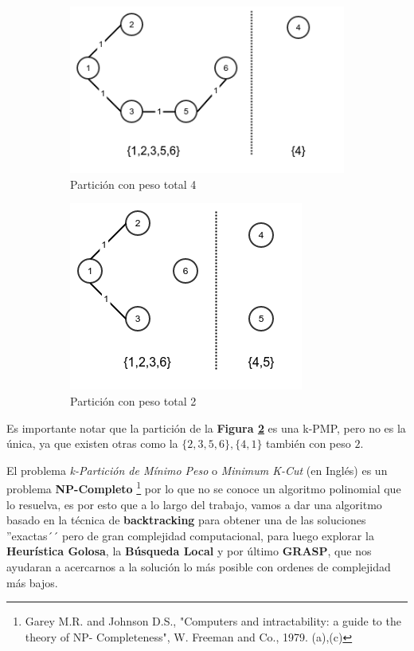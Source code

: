 \begin{figure}[H]
	\begin{subfigure}{.5\textwidth}
		\includegraphics[scale=0.5]{intro/ejemplito3.png}
		\caption{Partici\'on con peso total 4}
		\label{ejemplito3}
	\end{subfigure}
	\begin{subfigure}{.5\textwidth}
		\centering
		\includegraphics[scale=0.5]{intro/ejemplito4.png}
		\caption{Partici\'on con peso total 2}
		\label{ejemplito4}
	\end{subfigure}
\caption{}
\label{}
\end{figure}

Es importante notar que la partici\'on de la \textbf{Figura \ref{ejemplito4}} es una k-PMP, pero no es la \'unica, ya que existen otras como la $\{2,3,5,6\},\{4,1\}$ tambi\'en con peso $2$.

El problema \textit{k-Partici\'on de M\'inimo Peso} o \textit{Minimum K-Cut} (en Ingl\'es) es un problema \textbf{NP-Completo} \footnote{Garey M.R. and Johnson D.S., "Computers and intractability: a guide to the theory of NP- Completeness", W. Freeman and Co., 1979. (a),(c)} por lo que no se conoce un algoritmo polinomial que lo resuelva, es por esto que a lo largo del trabajo, vamos a dar una algoritmo basado en la t\'ecnica de \textbf{backtracking} para obtener una de las soluciones ''exactas´´ pero de gran complejidad computacional, para luego explorar la \textbf{Heur\'istica Golosa}, la \textbf{B\'usqueda Local} y por \'ultimo \textbf{GRASP}, que nos ayudaran a acercarnos a la soluci\'on lo m\'as posible con ordenes de complejidad m\'as bajos.